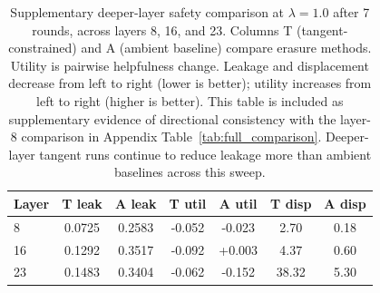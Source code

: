 \begin{table}[t]
\centering
\caption{Supplementary deeper-layer safety comparison at $\lambda=1.0$ after 7 rounds, across layers 8, 16, and 23. Columns T (tangent-constrained) and A (ambient baseline) compare erasure methods. Utility is pairwise helpfulness change. Leakage and displacement decrease from left to right (lower is better); utility increases from left to right (higher is better). This table is included as supplementary evidence of directional consistency with the layer-8 comparison in Appendix Table~\ref{tab:full_comparison}. Deeper-layer tangent runs continue to reduce leakage more than ambient baselines across this sweep.}
\label{tab:repo_snapshot_safety}
\small
\begin{tabular}{lcccccc}
\toprule
Layer & T leak & A leak & T util & A util & T disp & A disp \\
\midrule
8 & 0.0725 & 0.2583 & -0.052 & -0.023 & 2.70 & 0.18 \\
16 & 0.1292 & 0.3517 & -0.092 & +0.003 & 4.37 & 0.60 \\
23 & 0.1483 & 0.3404 & -0.062 & -0.152 & 38.32 & 5.30 \\
\bottomrule
\end{tabular}
\end{table}
